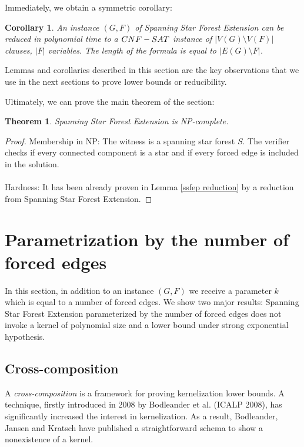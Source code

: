 \documentclass[en]{pracamgr}
\newtheorem{theorem}{Theorem}
\newtheorem{corollary}{Corollary}
\newcommand{\ssfep}{{\sc Spanning Star Forest Extension}}
\newcommand{\cnfsat}{{\sc CNF-SAT}}
\begin{document}
Immediately, we obtain a symmetric corollary:

\begin{corollary}\label{reduction size}
	An instance $(G,F)$ of \ssfep{} can be reduced in polynomial time to a $\cnfsat{}$ instance of $|V(G) \setminus V(F)|$ clauses, $|F|$ variables. The length of the formula is equal to $|E(G) \setminus F|$.
\end{corollary}

Lemmas and corollaries described in this section are the key observations that we use in the next sections to prove lower bounds or reducibility.

Ultimately, we can prove the main theorem of the section:
\begin{theorem}
	\ssfep{} is NP-complete.
\end{theorem}

\begin{proof}
	Membership in NP: The witness is a spanning star forest $S$. The verifier checks if every connected component is a star and if every forced edge is included in the solution.
	\\\\
	Hardness: It has been already proven in Lemma \ref{ssfep reduction} by a reduction from \ssfep{}.
\end{proof}

\section{Parametrization by the number of forced edges}

In this section, in addition to an instance $(G,F)$ we receive a parameter $k$ which is equal to a number of forced edges. We show two major results: \ssfep{} parameterized by the number of forced edges does not invoke a kernel of polynomial size and a lower bound under strong exponential hypothesis.

\subsection{Cross-composition}

A \emph{cross-composition} is a framework for proving kernelization lower bounds. A technique, firstly introduced in 2008 by Bodleander et al. (ICALP 2008), has significantly increased the interest in kernelization. As a result, Bodleander, Jansen and Kratsch have published a straightforward schema to show a nonexistence of a kernel.
\end{document}
